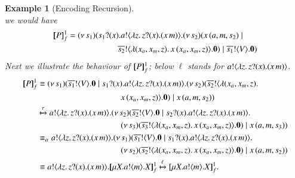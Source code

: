 \documentclass[preprint,11pt]{elsarticle}
\newtheorem{example}{Example}[section]
\begin{document}
{\begin{example}[Encoding Recursion]
$$$$
we would have %
\begin{align*}
[\!\![P]\!\!]^1_f & =  (\nu\, s_1)(s_1 ? (x) .  a ! \langle \lambda z.\,z ? (x) . (x\, {m}) \rangle . (\nu\, s_2)(x\, {(a,m, s_2)}  \;|\; \\
 & \qquad \qquad \qquad \overline{s_2} ! \langle \lambda (x_a, x_m, z).\,x\, {(x_a, x_m, z)} \rangle . \mathbf{0})\;|\; \overline{s_1} ! \langle V \rangle . \mathbf{0})
\end{align*}
Next we illustrate the behaviour of $[\!\![P]\!\!]^1_f$; below $\ell$ stands for $a ! \langle \lambda z.\,z ? (x) . (x\, {m}) \rangle$.
\begin{align*}
\pmapp{P}{1}{f} & \scong  \newsp{s_1}{\bout{\dual{s_1}}{V} \inact \Par \binp{s_1}{x} \bout{a}{\abs{z}{\binp{z}{x} (\appl{x}{m})}} \newsp{s_2}{\bout{\dual{s_2}}{\abs{(x_a, x_m, z)}{\\
&  \qquad \qquad \qquad \qquad \quad \quad  \appl{x}{(x_a, x_m, z)}}} \inact} 
\Par \appl{x}{(a,m, s_2)}} \\
& \hby{\tau}  \bout{a}{\abs{z}{\binp{z}{x} (\appl{x}{m})}} \newsp{s_2}{\bout{\dual{s_2}}{V} \inact \Par \binp{s_2}{x} \bout{a}{\abs{z}{\binp{z}{x} (\appl{x}{m})}} \\
&  \qquad \qquad \quad \qquad \qquad \quad \newsp{s_3}{\bout{\dual{s_3}}{\abs{(x_a, x_m, z)}{\appl{x}{(x_a, x_m, z)}}} \inact} \Par \appl{x}{(a,m, s_3)}} \\
& \scong_{\alpha}  \bout{a}{\abs{z}{\binp{z}{x} (\appl{x}{m})}} \newsp{s_1}{\bout{\dual{s_1}}{V} \inact \Par \binp{s_1}{x} \bout{a}{\abs{z}{\binp{z}{x} (\appl{x}{m})}} \\
&  \qquad \qquad \qquad \qquad \quad \quad \newsp{s_2}{\bout{\dual{s_2}}{\abs{(x_a, x_m, z)}{\appl{x}{(x_a, x_m, z)}}} \inact} \Par \appl{x}{(a,m, s_2)}} \\
& \scong  
		\bout{a}{\abs{z}{\binp{z}{x} (\appl{x}{m})}} \pmapp{\recp{X}{\bout{a}{m} \varp{X}}}{1}{f} \hby{\ell} 
		\pmapp{\recp{X}{\bout{a}{m} \varp{X}}}{1}{f}.
\end{align*}
\end{example}

}
\end{document}
